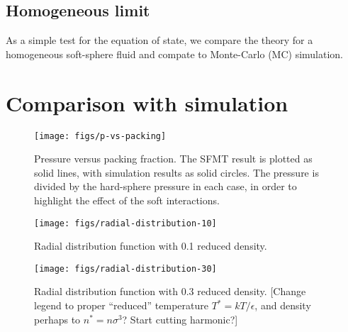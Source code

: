 \documentclass[letterpaper,twocolumn,amsmath,amssymb,prb]{revtex4-1}
\newcommand{\red}[1]{{\color{red} #1}}
\newcommand{\fixme}[1]{\red{[#1]}}
\begin{document}
\subsection{Homogeneous limit}

As a simple test for the equation of state, we compare the theory for
a homogeneous soft-sphere fluid and compate to Monte-Carlo (MC) simulation.
 
\section{Comparison with simulation}

\begin{figure}
\begin{center}
\texttt{[image: figs/p-vs-packing]}
\end{center}
\caption{Pressure versus packing fraction.  The SFMT result is plotted
  as solid lines, with simulation results as solid circles.  The
  pressure is divided by the hard-sphere pressure in each case, in
  order to highlight the effect of the soft interactions.}
\label{fig:p-vs-packing}
\end{figure}

\begin{figure}
\begin{center}
\texttt{[image: figs/radial-distribution-10]}
\end{center}
\caption{Radial distribution function with 0.1 reduced density.}
\label{fig:radial-distribution-10}
\end{figure}

\begin{figure}
\begin{center}
\texttt{[image: figs/radial-distribution-30]}
\end{center}
\caption{Radial distribution function with 0.3 reduced density.
  \fixme{Change legend to proper ``reduced'' temperature 
    $T^* = kT/\epsilon$, and density perhaps to $n^* = n\sigma^3$?
    Start cutting harmonic?}}
\label{fig:radial-distribution-30}
\end{figure}

\end{document}
